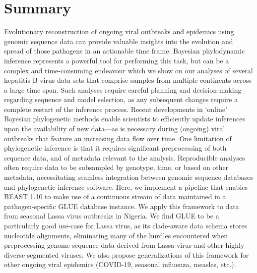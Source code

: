 \chapter{Summary}                                 \label{ch:summary}

Evolutionary reconstruction of ongoing viral outbreaks and epidemics using genomic sequence data can provide valuable insights into the evolution and spread of those pathogens in an actionable time frame.
Bayesian phylodynamic inference represents a powerful tool for performing this task, but can be a complex and time-consuming endeavour which we show on our analyses of several hepatitis B virus data sets that comprise samples from multiple continents across a large time span.
Such analyses require careful planning and decision-making regarding sequence and model selection, as any subsequent changes require a complete restart of the inference process.
Recent developments in ‘online’ Bayesian phylogenetic methods enable scientists to efficiently update inferences upon the availability of new data—as is necessary during (ongoing) viral outbreaks that feature an increasing data flow over time.
One limitation of phylogenetic inference is that it requires significant preprocessing of both sequence data, and of metadata relevant to the analysis.
Reproducible analyses often require data to be subsampled by genotype, time, or based on other metadata, necessitating seamless integration between genomic sequence databases and phylogenetic inference software.
Here, we implement a pipeline that enables BEAST 1.10 to make use of a continuous stream of data maintained in a pathogen-specific GLUE database instance.
We apply this framework to data from seasonal Lassa virus outbreaks in Nigeria.
We find GLUE to be a particularly good use-case for Lassa virus, as its clade-aware data schema stores nucleotide alignments, eliminating many of the hurdles encountered when preprocessing genome sequence data derived from Lassa virus and other highly diverse segmented viruses.
We also propose generalizations of this framework for other ongoing viral epidemics (COVID-19, seasonal influenza, measles, etc.).


\cleardoublepage

